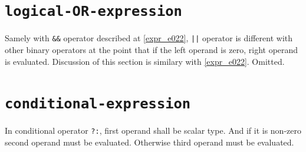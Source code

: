 \section{\tt{logical-OR-expression}}
Samely with {\tt{\&\&}} operator described at \ref{expr_e022},
{\tt{||}} operator is different with other binary operators
at the point that if the left operand is zero, right operand
is evaluated. Discussion of this section is similary with
\ref{expr_e022}. Omitted.

\section{\tt{conditional-expression}}

In conditional operator {\tt{?:}},
first operand shall be scalar type. And if it is non-zero
second operand must be evaluated. Otherwise third operand must be
evaluated.

